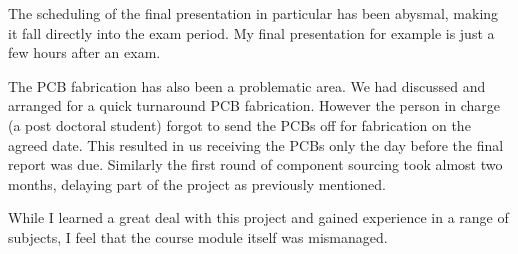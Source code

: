 \documentclass[a4paper,10pt]{article}
\begin{document}
The scheduling of the final presentation in particular has been abysmal, making
it fall directly into the exam period. My final presentation for example is just
a few hours after an exam.

The PCB fabrication has also been a problematic area. We had discussed and arranged
for a quick turnaround PCB fabrication. However the person in charge (a post doctoral
student) forgot to send the PCBs off for fabrication on the agreed date. This resulted
in us receiving the PCBs only the day before the final report was due. Similarly
the first round of component sourcing took almost two months, delaying part of
the project as previously mentioned.

While I learned a great deal with this project and gained experience in a range
of subjects, I feel that the course module itself was mismanaged.
\end{document}

